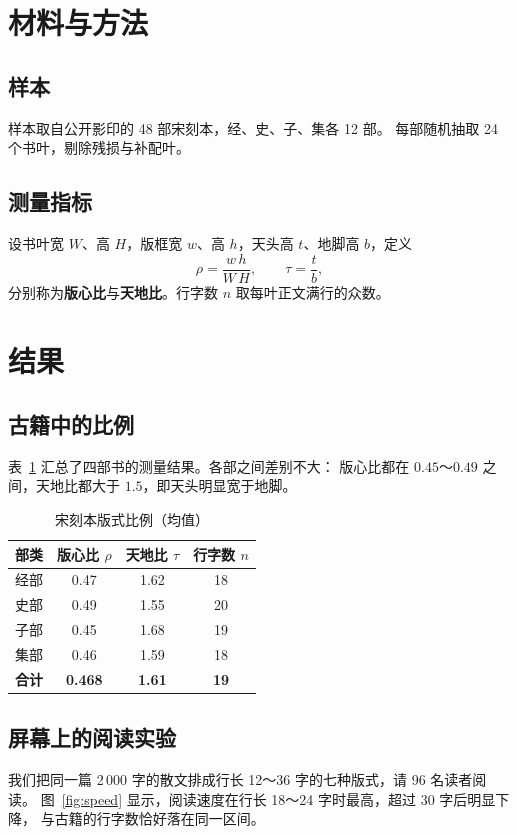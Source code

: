 \documentclass[UTF8,zihao=-4]{ctexart}
\begin{document}
\section{材料与方法}

\subsection{样本}
样本取自公开影印的 48 部宋刻本，经、史、子、集各 12 部\cite{zhou2019}。
每部随机抽取 24 个书叶，剔除残损与补配叶。

\subsection{测量指标}
设书叶宽 $W$、高 $H$，版框宽 $w$、高 $h$，天头高 $t$、地脚高 $b$，定义
\begin{equation}
  \label{eq:ratio}
  \rho = \frac{w\,h}{W\,H}, \qquad \tau = \frac{t}{b},
\end{equation}
分别称为\textbf{版心比}与\textbf{天地比}。行字数 $n$ 取每叶正文满行的众数。

\section{结果}

\subsection{古籍中的比例}
表~\ref{tab:ratio} 汇总了四部书的测量结果。各部之间差别不大：
版心比都在 $0.45$～$0.49$ 之间，天地比都大于 $1.5$，即天头明显宽于地脚。

\begin{table}[htbp]
  \centering
  \caption{宋刻本版式比例（均值）}
  \label{tab:ratio}
  \begin{tabular}{@{}l c c c@{}}
    \toprule
    部类 & 版心比 $\rho$ & 天地比 $\tau$ & 行字数 $n$ \\
    \midrule
    经部 & 0.47 & 1.62 & 18 \\
    史部 & 0.49 & 1.55 & 20 \\
    子部 & 0.45 & 1.68 & 19 \\
    集部 & 0.46 & 1.59 & 18 \\
    \midrule
    \textbf{合计} & \textbf{0.468} & \textbf{1.61} & \textbf{19} \\
    \bottomrule
  \end{tabular}
\end{table}

\subsection{屏幕上的阅读实验}
我们把同一篇 2\,000 字的散文排成行长 12～36 字的七种版式，请 96 名读者阅读。
图~\ref{fig:speed} 显示，阅读速度在行长 18～24 字时最高，超过 30 字后明显下降，
与古籍的行字数恰好落在同一区间。
\end{document}
